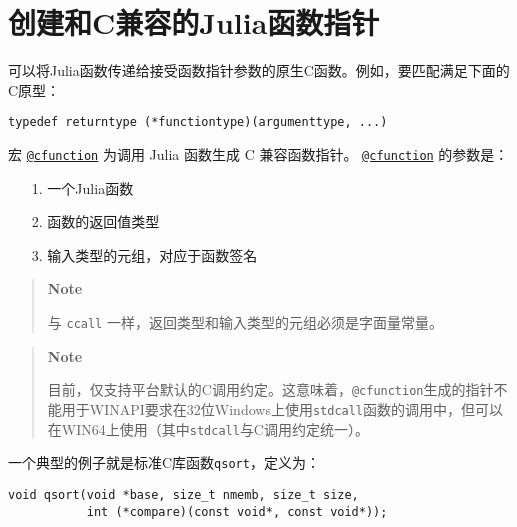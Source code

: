 \hypertarget{17519979972664810183}{}


\section{创建和C兼容的Julia函数指针}



可以将Julia函数传递给接受函数指针参数的原生C函数。例如，要匹配满足下面的C原型：




\begin{lstlisting}
typedef returntype (*functiontype)(argumenttype, ...)
\end{lstlisting}



宏 \hyperlink{11617107520401351255}{\texttt{@cfunction}} 为调用 Julia 函数生成 C 兼容函数指针。 \hyperlink{11617107520401351255}{\texttt{@cfunction}} 的参数是：



\begin{itemize}
\item[1. ] 一个Julia函数


\item[2. ] 函数的返回值类型


\item[3. ] 输入类型的元组，对应于函数签名

\end{itemize}


\begin{quote}
\textbf{Note}

与 \texttt{ccall} 一样，返回类型和输入类型的元组必须是字面量常量。

\end{quote}


\begin{quote}
\textbf{Note}

目前，仅支持平台默认的C调用约定。这意味着，\texttt{@cfunction}生成的指针不能用于WINAPI要求在32位Windows上使用\texttt{stdcall}函数的调用中，但可以在WIN64上使用（其中\texttt{stdcall}与C调用约定统一）。

\end{quote}


一个典型的例子就是标准C库函数\texttt{qsort}，定义为：




\begin{lstlisting}
void qsort(void *base, size_t nmemb, size_t size,
           int (*compare)(const void*, const void*));
\end{lstlisting}



